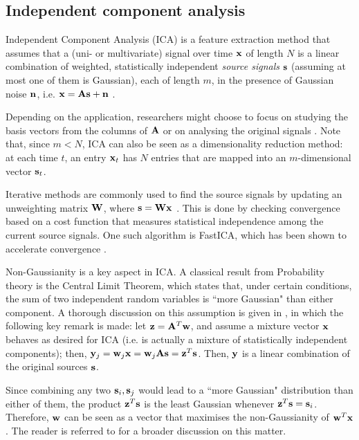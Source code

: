 \documentclass[../main.tex]{subfiles} \label{chapter_soa}
\begin{document}
\subsection{Independent component analysis} \label{subsection_ica}
Independent Component Analysis (ICA) is a feature extraction method that assumes that a (uni- or multivariate) signal over time $\mathbf{x}$ of length $N$ is a linear combination of weighted, statistically independent \emph{source signals} $\mathbf{s}$ (assuming at most one of them is Gaussian), each of length $m$, in the presence of Gaussian noise $\mathbf{n}$, i.e. $\mathbf{x} = \mathbf{As} + \mathbf{n}$ \cite{Kasprzak}.
\par Depending on the application, researchers might choose to focus on studying the basis vectors from the columns of $\mathbf{A}$ or on analysing the original signals \cite{Kasprzak,Hsieh2009,Chien2006,Jang2001}. Note that, since $m<N$, ICA can also be seen as a dimensionality reduction method: at each time $t$, an entry $\mathbf{x}_t$ has $N$ entries that are mapped into an $m$-dimensional vector $\mathbf{s}_t$. 
\par Iterative methods are commonly used to find the source signals by updating an unweighting matrix $\mathbf{W}$, where $\mathbf{s} = \mathbf{Wx}$ \cite{Hyvarinen2000}. This is done by checking convergence based on a cost function that measures statistical independence among the current source signals. One such algorithm is FastICA, which has been shown to accelerate convergence \cite{Hyvarinen2000, Kasprzak}. 
\par Non-Gaussianity is a key aspect in ICA. A classical result from Probability theory is the Central Limit Theorem, which states that, under certain conditions, the sum of two independent random variables is ``more Gaussian" than either component. A thorough discussion on this assumption is given in \cite{Hyvarinen2000}, in which the following key remark is made: let $\mathbf{z} = \mathbf{A}^T\mathbf{w}$, and assume a mixture vector $\mathbf{x}$ behaves as desired for ICA (i.e. is actually a mixture of statistically independent components); then, $\mathbf{y}_j = \mathbf{w}_j\mathbf{x} = \mathbf{w}_j\mathbf{As} = \mathbf{z}^T\mathbf{s}$. Then, $\mathbf{y}$ is a linear combination of the original sources $\mathbf{s}$. 
\par Since combining any two $\mathbf{s}_i, \mathbf{s}_j$ would lead to a ``more Gaussian" distribution than either of them, the product $\mathbf{z}^T\mathbf{s}$ is the least Gaussian whenever $\mathbf{z}^T\mathbf{s} = \mathbf{s}_i$. Therefore, $\mathbf{w}$ can be seen as a vector that maximises the non-Gaussianity of $\mathbf{w}^T\mathbf{x}$. The reader is referred to \cite{Hyvarinen2000} for a broader discussion on this matter.
\end{document}
